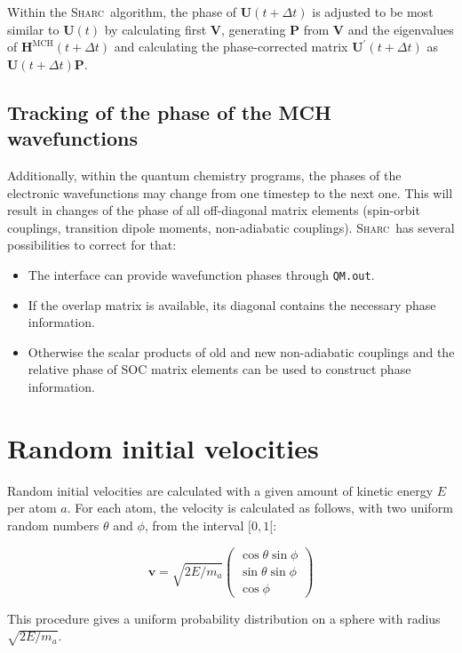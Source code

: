 \documentclass[a4paper,11pt,DIV=15,openany,twoside=false]{scrbook}
\newcommand{\tthdump}[1]{#1}
\newcommand{\sharc}{\textsc{Sharc}}
\newcommand{\ttt}[1]{\texttt{#1}}
\renewcommand{\vec}[1]{\ensuremath{\mathbf{#1}}}
\begin{document}
Within the \sharc\ algorithm, the phase of $\vec{U}(t+\Delta t)$ is adjusted to be most similar to $\vec{U}(t)$ by calculating first $\vec{V}$, generating $\vec{P}$ from $\vec{V}$ and the eigenvalues of $\vec{H}^{\text{MCH}}(t+\Delta t)$ and calculating the phase-corrected matrix $\vec{U}^\prime(t+\Delta t)$ as $\vec{U}(t+\Delta t)\vec{P}$.

\subsection{Tracking of the phase of the MCH wavefunctions}

Additionally, within the quantum chemistry programs, the phases of the electronic wavefunctions may change from one timestep to the next one. This will result in changes of the phase of all off-diagonal matrix elements (spin-orbit couplings, transition dipole moments, non-adiabatic couplings). \sharc\ has several possibilities to correct for that:
\begin{itemize}
  \item The interface can provide wavefunction phases through \ttt{QM.out}.
  \item If the overlap matrix is available, its diagonal contains the necessary phase information.
  \item Otherwise the scalar products of old and new non-adiabatic couplings and the relative phase of SOC matrix elements can be used to construct phase information.
\end{itemize}


\section{Random initial velocities}\label{met:veloc}

Random initial velocities are calculated with a given amount of kinetic energy $E$ per atom $a$. For each atom, the velocity is calculated as follows, with two uniform random numbers $\theta$ and $\phi$, from the interval $[0,1[$:
\tthdump{
  \begin{equation}
    \vec{v}=\sqrt{2E/m_a}
    \begin{pmatrix}
      \cos{\theta}\sin{\phi}\\
      \sin{\theta}\sin{\phi}\\
      \cos{\phi}
    \end{pmatrix}
  \end{equation}
}
This procedure gives a uniform probability distribution on a sphere with radius $\sqrt{2E/m_a}$.
\end{document}
